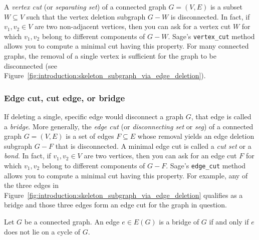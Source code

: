 A \emph{vertex cut} (or \emph{separating set}) of a connected graph
$G = (V, E)$ is a subset $W \subseteq V$ such that the vertex deletion
subgraph $G - W$ is disconnected. In fact, if $v_1, v_2 \in V$ are two
non-adjacent vertices, then you can ask for a vertex cut $W$ for which
$v_1, v_2$ belong to different components of $G - W$. Sage's
\verb!vertex_cut! method allows you to compute a minimal cut having
this property. For many connected graphs, the removal of a single
vertex is sufficient for the graph to be disconnected
(see Figure~\ref{fig:introduction:skeleton_subgraph_via_edge_deletion}).



\subsubsection{Edge cut, cut edge, or bridge}

If deleting a single, specific edge would disconnect a graph $G$, that
edge is called a \emph{bridge}. More generally, the \emph{edge cut}
(or \emph{disconnecting set} or \emph{seg}) of a connected graph
$G = (V, E)$ is a set of edges $F \subseteq E$ whose removal yields an
edge deletion subgraph $G - F$ that is disconnected. A minimal edge
cut is called a \emph{cut set} or a \emph{bond}.
In fact, if $v_1, v_2 \in V$ are two vertices, then you can ask for an
edge cut $F$ for which $v_1, v_2$ belong to different components of
$G - F$. Sage's \verb!edge_cut! method allows you to compute a minimal
cut having this property. For example, any of the three edges in
Figure~\ref{fig:introduction:skeleton_subgraph_via_edge_deletion}
qualifies as a bridge and those three edges form an edge cut for the
graph in question.

\begin{theorem}
Let $G$ be a connected graph. An edge $e \in E(G)$ is a bridge of $G$
if and only if $e$ does not lie on a cycle of $G$.
\end{theorem}

